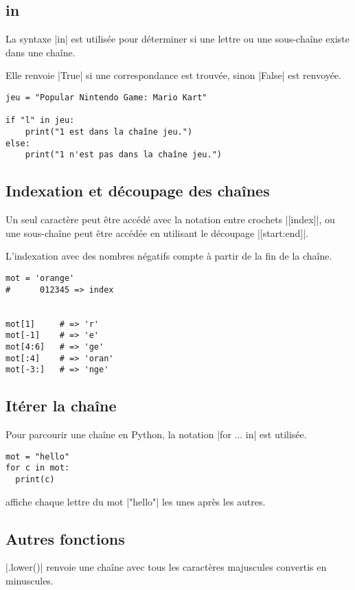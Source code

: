 \documentclass[11pt, a4paper]{book}
\begin{document}
\subsection{in}
La syntaxe |in| est utilisée pour déterminer si une lettre ou une sous-chaîne existe dans une chaîne. 

Elle renvoie |True| si une correspondance est trouvée, sinon |False| est renvoyée.


\begin{lstlisting}
jeu = "Popular Nintendo Game: Mario Kart"

if "l" in jeu:
    print("1 est dans la chaîne jeu.")
else:
    print("1 n'est pas dans la chaîne jeu.")
\end{lstlisting}


\subsection{Indexation et découpage des chaînes}
Un seul caractère peut être accédé avec la notation entre crochets |[index]|, ou une sous-chaîne peut être accédée en utilisant le découpage |[start:end]|.

L'indexation avec des nombres négatifs compte à partir de la fin de la chaîne.



\begin{lstlisting}
mot = 'orange'
#      012345 => index


mot[1]     # => 'r'
mot[-1]    # => 'e'
mot[4:6]   # => 'ge'
mot[:4]    # => 'oran'
mot[-3:]   # => 'nge'
\end{lstlisting}


\subsection{Itérer la chaîne}
Pour parcourir une chaîne en Python, la notation |for ... in| est utilisée.



\begin{lstlisting}
mot = "hello"
for c in mot:
  print(c)
\end{lstlisting}
affiche chaque lettre du mot |"hello"| les unes après les autres.

\subsection{Autres fonctions}
|.lower()| renvoie une chaîne avec tous les caractères majuscules convertis en minuscules.
\end{document}
